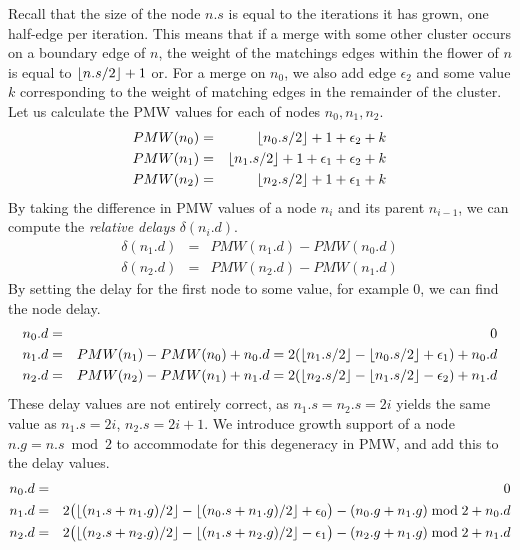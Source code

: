 Recall that the size of the node $n.s$ is equal to the iterations it has grown, one half-edge per iteration. This means that if a merge with some other cluster occurs on a boundary edge of $n$, the weight of the matchings edges within the flower of $n$ is equal to ${\left \lfloor n.s/2 \right \rfloor }+1$ or. For a merge on $n_0$, we also add edge $\epsilon_2$ and some value $k$ corresponding to the weight of matching edges in the remainder of the cluster. Let us calculate the PMW values for each of nodes $n_0, n_1, n_2$.
\begin{eqnarray*}
  PMW(n_0) &=& {\left \lfloor n_0.s/2 \right \rfloor }+1 + \epsilon_2 + k \\
  PMW(n_1) &=& {\left \lfloor n_1.s/2 \right \rfloor }+1 + \epsilon_1 + \epsilon_2 + k \\
  PMW(n_2) &=& {\left \lfloor n_2.s/2 \right \rfloor }+1 + \epsilon_1 +k
\end{eqnarray*}
By taking the difference in PMW values of a node $n_i$ and its parent $n_{i-1}$, we can compute the \emph{relative delays} $\delta(n_i.d)$.
\begin{eqnarray*}
  \delta(n_1.d) &=& PMW(n_1.d) - PMW(n_0.d) \\
  \delta(n_2.d) &=& PMW(n_2.d) - PMW(n_1.d)
\end{eqnarray*}
By setting the delay for the first node to some value, for example 0, we can find the node delay.
\begin{eqnarray*}
  n_0.d &=& 0 \\
  n_1.d &=& PMW(n_1) - PMW(n_0) + n_0.d = 2({\left \lfloor n_1.s/2 \right \rfloor } - {\left \lfloor n_0.s/2 \right \rfloor } + \epsilon_1) + n_0.d \\
  n_2.d &=& PMW(n_2) - PMW(n_1) + n_1.d = 2({\left \lfloor n_2.s/2 \right \rfloor } - {\left \lfloor n_1.s/2 \right \rfloor } - \epsilon_2) + n_1.d
\end{eqnarray*}
These delay values are not entirely correct, as $n_1.s = n_2.s = 2i$ yields the same value as  $n_1.s = 2i$, $n_2.s = 2i + 1$. We introduce growth support of a node $n.g = n.s \bmod 2$ to accommodate for this degeneracy in PMW, and add this to the delay values.
\begin{eqnarray*}
  n_0.d &=& 0 \\
  n_1.d &=& 2\big({\left \lfloor (n_1.s+n_1.g)/2 \right \rfloor } - {\left \lfloor (n_0.s+n_1.g)/2 \right \rfloor } + \epsilon_0\big) - (n_0.g + n_1.g)\bmod 2 + n_0.d \\
  n_2.d &=& 2\big({\left \lfloor (n_2.s+n_2.g)/2 \right \rfloor } - {\left \lfloor (n_1.s+n_2.g)/2 \right \rfloor } - \epsilon_1\big) - (n_2.g + n_1.g)\bmod 2 + n_1.d
\end{eqnarray*}
